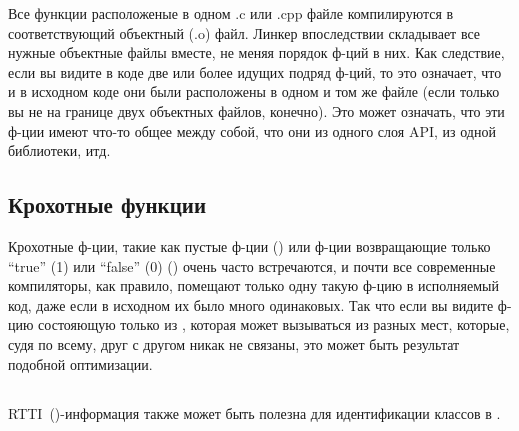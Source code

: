 Все функции расположеные в одном .c или .cpp файле компилируются в соответствующий объектный (.o) файл.
Линкер впоследствии складывает все нужные объектные файлы вместе, не меняя порядок ф-ций в них.
Как следствие, если вы видите в коде две или более идущих подряд ф-ций, то это означает, что и в исходном коде они 
были расположены в одном и том же файле (если только вы не на границе двух объектных файлов, конечно).
Это может означать, что эти ф-ции имеют что-то общее между собой, что они из одного слоя \ac{API}, из одной библиотеки, итд.%

\subsection{Крохотные функции}

Крохотные ф-ции, такие как пустые ф-ции ()
или ф-ции возвращающие только ``true'' (1) или ``false'' (0) () очень часто встречаются,
и почти все современные компиляторы, как правило, помещают только одну такую ф-цию в исполняемый код,
даже если в исходном их было много одинаковых.
Так что если вы видите ф-цию состояющую только из , которая может вызываться из разных мест,
которые, судя по всему, друг с другом никак не связаны, это может быть результат подобной оптимизации.

\subsection{\Cpp}

\ac{RTTI}~()-информация также может быть полезна для идентификации 
классов в \Cpp.

